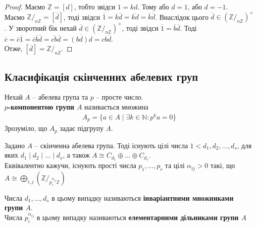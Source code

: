 \documentclass{math_library}
\begin{document}
\begin{proof}
Маємо $\mathbb{Z} = [d]$, тобто звідси $1 = kd$. Тому або $d = 1$, або $d = -1$.\\
Маємо $\mathbb{Z}/_{n \mathbb{Z}} = [\overline{d}]$, тоді звідси $\overline{1} = k \overline{d} = \overline{kd} = \overline{k} \overline{d}$. Внаслідок цього $\overline{d} \in (\mathbb{Z}/_{n \mathbb{Z}})^\times$. У зворотний бік нехай $\overline{d} \in (\mathbb{Z}/_{n \mathbb{Z}})^\times$, тоді звідси $\overline{1} = \overline{b} \overline{d}$. Тоді\\
$\overline{c} = \overline{c} \overline{1} = \overline{c} \overline{b} \overline{d} = \overline{cb} \overline{d} = \overline{(bd) d} = cb \overline{d}$.\\
Отже, $[\overline{d}] = \mathbb{Z}/_{n \mathbb{Z}}$.
\end{proof}

\subsection*{Класифікація скінченних абелевих груп}
\begin{definition*}
Нехай $A$ -- абелева група та $p$ -- просте число.\\
\textbf{$p$-компонентою групи $A$} називається множина
\begin{align*}
A_p = \{a \in A \mid \exists k \in \mathbb{N}: p^k a = 0 \}
\end{align*}
Зрозуміло, що $A_p$ задає підгрупу $A$.
\end{definition*}

\begin{theorem*}
Задано $A$ -- скінченна абелева група. Тоді існують цілі числа $1 < d_1,d_2,\dots,d_s$, для яких $d_1 \mid d_2 \mid \dots \mid d_s$, а також $A \cong C_{d_1} \oplus \dots \oplus C_{d_s}$.\\
Еквівалентно кажучи, існують прості числа $p_1,\dots,p_r$ та цілі $\alpha_{ij} > 0$ такі, що $\displaystyle A \cong \bigoplus_{i,j} \left(\mathbb{Z}/_{p_i^{\alpha_{ij}} \mathbb{Z}}\right)$
\end{theorem*}

Числа $d_1,\dots,d_s$ в цьому випадку називаються \textbf{інваріантними множниками групи $A$}.\\
Числа $p_i^{\alpha_{ij}}$ в цьому випадку називаються \textbf{елементарними дільниками групи $A$}
\end{document}
